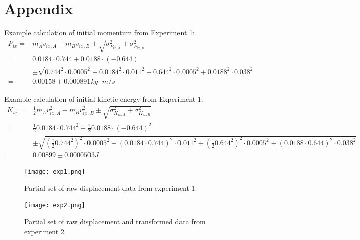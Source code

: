\documentclass[11pt]{article}
\begin{document}
\section{Appendix}
Example calculation of initial momentum from Experiment 1:\\
\begin{align*}
P_{ix} =& m_A v_{ix,A} + m_B v_{ix,B} \pm \sqrt{\sigma_{P_{ix,A}}^2+\sigma_{P_{ix,B}}^2} \\
=& 0.0184\cdot0.744 + 0.0188\cdot(-0.644) \\
&\pm \sqrt{0.744^2\cdot0.0005^2+0.0184^2\cdot0.011^2+0.644^2\cdot0.0005^2+0.0188^2\cdot0.038^2} \\
=& 0.00158\pm0.000891 kg\cdot m/s
\end{align*}

Example calculation of initial kinetic energy from Experiment 1:\\
\begin{align*}
K_{ix} =& \frac{1}{2}m_A v_{ix,A}^2 + m_B v_{ix,B}^2 \pm \sqrt{\sigma_{K_{ix,A}}^2+\sigma_{K_{ix,B}}^2} \\
=& \frac{1}{2}0.0184\cdot0.744^2 + \frac{1}{2}0.0188\cdot(-0.644)^2 \\
&\pm \sqrt{(\frac{1}{2}0.744^2)^2\cdot0.0005^2+(0.0184\cdot0.744)^2\cdot0.011^2+(\frac{1}{2}0.644^2)^2\cdot0.0005^2+(0.0188\cdot0.644)^2\cdot0.038^2} \\
=& 0.00899\pm0.0000503 J
\end{align*}


\begin{figure}[h]
\centering
\texttt{[image: exp1.png]}
\caption{Partial set of raw displacement data from experiment 1.}
\end{figure}

\begin{figure}[h]
\centering
\texttt{[image: exp2.png]}
\caption{Partial set of raw displacement and transformed data from experiment 2.}
\end{figure}




\end{document}

